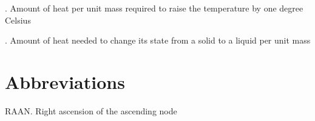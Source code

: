 \documentclass[oneside,12pt]{report}
\begin{document}
\vspace{10pt} 

\vspace{8pt}
. Amount of heat per unit mass required to raise the temperature by one degree Celsius

. Amount of heat needed to change its state from a solid to a liquid per unit mass

\chapter{Abbreviations}\label{Abbreviations}

\noindent RAAN. Right ascension of the ascending node

\vspace{5pt}




\renewcommand\bibname{Selected Bibliography Including Cited Works}
\nocite{*}  %

\end{document}

